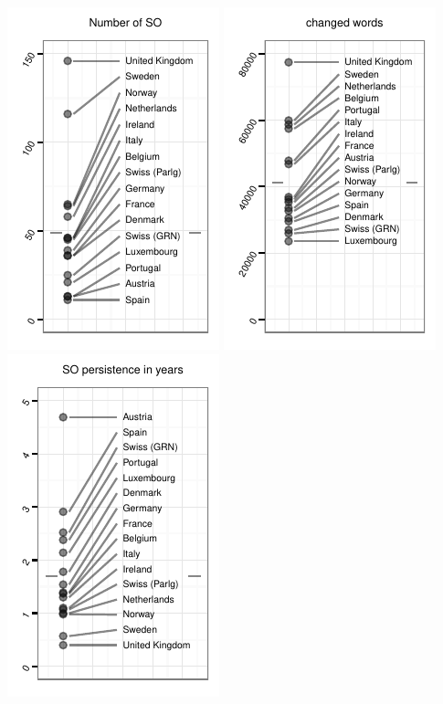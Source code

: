 \documentclass[a4paper]{article}
\begin{document}
\includegraphics{in_progress_files/figure-latex/unnamed-chunk-2-1.pdf}
\includegraphics{in_progress_files/figure-latex/unnamed-chunk-2-2.pdf}
\includegraphics{in_progress_files/figure-latex/unnamed-chunk-2-3.pdf}
\end{document}

